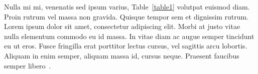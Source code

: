 Nulla mi mi, venenatis sed ipsum varius, Table~\ref{table1} volutpat
euismod diam. Proin rutrum vel massa non gravida. Quisque tempor sem
et dignissim rutrum. Lorem ipsum dolor sit amet, consectetur
adipiscing elit. Morbi at justo vitae nulla elementum commodo eu id
massa. In vitae diam ac augue semper tincidunt eu ut eros. Fusce
fringilla erat porttitor lectus cursus, vel sagittis arcu
lobortis. Aliquam in enim semper, aliquam massa id, cursus
neque. Praesent faucibus semper libero~\cite{bib3}.
